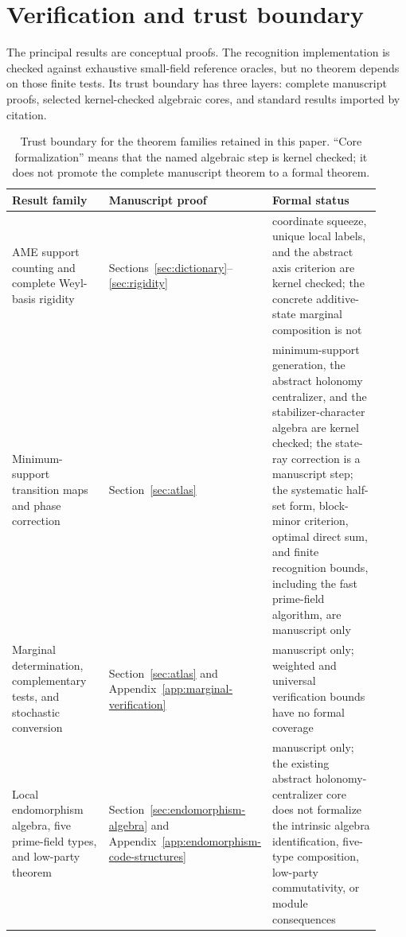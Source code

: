 \section{Verification and trust boundary}\label{sec:verification}

The principal results are conceptual proofs.  The recognition
implementation is checked against exhaustive small-field reference oracles,
but no theorem depends on those finite tests.
Its trust boundary has three layers: complete manuscript proofs, selected
kernel-checked algebraic cores, and standard results imported by citation.

\begin{table}[H]
\centering
\footnotesize
\caption{Trust boundary for the theorem families retained in this paper.
``Core formalization'' means that the named algebraic step is kernel checked;
it does not promote the complete manuscript theorem to a formal theorem.}
\label{tab:trust-boundary}
\begin{tabular}{@{}L{0.27\linewidth}L{0.34\linewidth}L{0.31\linewidth}@{}}
\toprule
Result family & Manuscript proof & Formal status \\
\midrule
AME support counting and complete Weyl-basis rigidity &
Sections~\ref{sec:dictionary}--\ref{sec:rigidity} &
coordinate squeeze, unique local labels, and the abstract axis criterion are
kernel checked; the concrete additive-state marginal composition is not \\
Minimum-support transition maps and phase correction &
Section~\ref{sec:atlas} &
minimum-support generation, the abstract holonomy centralizer, and the
stabilizer-character algebra are kernel checked; the state-ray correction is
a manuscript step; the systematic half-set form, block-minor criterion,
optimal direct sum, and finite recognition bounds, including the fast
prime-field algorithm, are manuscript only \\
Marginal determination, complementary tests, and stochastic conversion &
Section~\ref{sec:atlas} and Appendix~\ref{app:marginal-verification} & manuscript only; weighted and universal verification bounds have no formal coverage \\
Local endomorphism algebra, five prime-field types, and low-party theorem &
Section~\ref{sec:endomorphism-algebra} and
Appendix~\ref{app:endomorphism-code-structures} &
manuscript only; the existing abstract holonomy-centralizer core does not
formalize the intrinsic algebra identification, five-type composition,
low-party commutativity, or module consequences \\

\end{tabular}
\end{table}
